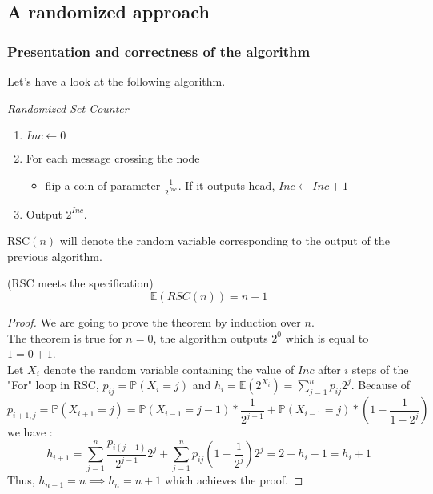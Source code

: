 \subsection{A randomized approach}

\subsubsection{Presentation and correctness of the algorithm}
Let's have a look at the following algorithm.
\begin{algo}
\emph{Randomized Set Counter}
\begin{enumerate}
	\item $Inc \leftarrow 0$
	\item For each message crossing the node 
\begin{itemize}
	\item flip a coin of parameter $\frac{1}{2^{Inc}}$. If it outputs head, $Inc \leftarrow Inc + 1$
\end{itemize}
	\item Output $2^{Inc}$.
	\end{enumerate} 
\end{algo}

RSC$\left(n\right)$ will denote the random variable corresponding to the output of the previous algorithm.
\begin{theorem} (RSC meets the specification)
\[\mathbb{E}\left(RSC(n)\right) = n+1\]
\end{theorem}

\begin{proof}
We are going to prove the theorem by induction over $n$.\\
The theorem is true for $n = 0$, the algorithm outputs $2^0$ which is equal to $1 = 0 + 1$.\\
Let $X_i$ denote the random variable containing the value of $Inc$ after $i$ steps of the "For" loop in RSC, $p_{ij} = \mathbb{P}\left(X_i = j\right)$ and $h_i = \mathbb{E}\left(2^{X_i}\right) = \sum_{j=1}^{n}p_{ij}2^j$. Because of \[p_{i+1,j} = \mathbb{P}\left(X_{i+1} = j\right)=\mathbb{P}\left(X_{i-1} = j-1\right)*\frac{1}{2^{j-1}}+ \mathbb{P}\left(X_{i-1} = j\right)*\left(1-\frac{1}{1-2^j}\right)\] we have : \[h_{i+1} = \sum_{j=1}^{ n}\frac{p_{i(j-1)}}{2^{j-1}}2^j + \sum_{j=1}^{ n}p_{ij}\left(1-\frac{1}{2^j}\right)2^j = 2 + h_i - 1 = h_i + 1\] Thus, $h_{n-1} = n  \implies h_n = n + 1$ which achieves the proof.
\end{proof}




